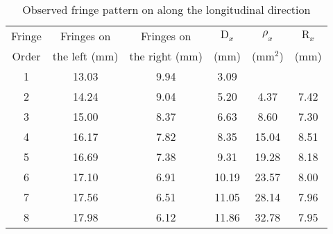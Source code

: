 \begin{table}[H]
    \centering
    \begin{tabular}{|c|c|c|c|c|c|}
        \hline
        Fringe    & Fringes on     & Fringes on       & $\text{D}_x$        & $\rho_x$   & $\text{R}_x$    \\ 
        Order     & the left (mm)  & the right (mm)   & (mm)       & ($\text{mm}^2$)   & (mm)   \\ \hline
        1 & 13.03 & 9.94 &  3.09 &      &     \\
         2 & 14.24 & 9.04 &  5.20  &  4.37 & 7.42 \\
         3 & 15.00 & 8.37 &  6.63 &  8.60 & 7.30 \\
         4 & 16.17 & 7.82 &  8.35 & 15.04 & 8.51 \\
         5 & 16.69 & 7.38 &  9.31 & 19.28 & 8.18 \\
         6 & 17.10 & 6.91 & 10.19 & 23.57 & 8.00  \\
         7 & 17.56 & 6.51 & 11.05 & 28.14 & 7.96 \\
         8 & 17.98 & 6.12 & 11.86 & 32.78 & 7.95 \\\hline
       \end{tabular}
    \caption{Observed fringe pattern on along the longitudinal direction}
    \label{tab:1}
\end{table}